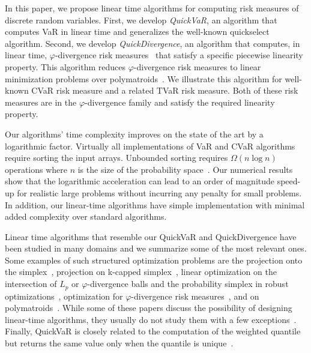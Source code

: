\documentclass[10pt]{article} %
\renewcommand{\cite}{\citep}
\begin{document}
In this paper, we propose linear time algorithms for computing risk measures of discrete random variables. First, we develop \emph{QuickVaR}, an algorithm that computes VaR in linear time and generalizes the well-known quickselect algorithm. Second, we develop \emph{QuickDivergence}, an algorithm that computes, in linear time, $\varphi$-divergence risk measures~\cite{Ahmadi-Javid2012} that satisfy a specific piecewise linearity property. This algorithm reduces $\varphi$-divergence risk measures to linear minimization problems over polymatroids~\cite{Follmer2016}. We illustrate this algorithm for well-known CVaR risk measure and a related TVaR risk measure. Both of these risk measures are in the $\varphi$-divergence family and satisfy the required linearity property.  

Our algorithms' time complexity improves on the state of the art by a logarithmic factor. Virtually all implementations of VaR and CVaR algorithms require sorting the input arrays. Unbounded sorting requires $\Omega(n \log n)$ operations where $n$ is the size of the probability space~\cite{Follmer2016}. Our numerical results show that the logarithmic acceleration can lead to an order of magnitude speed-up for realistic large problems without incurring any penalty for small problems. In addition, our linear-time algorithms have simple implementation with minimal added complexity over standard algorithms.


Linear time algorithms that resemble our QuickVaR and QuickDivergence have been studied in many domains and we summarize some of the most relevant ones. Some examples of such structured optimization problems are the projection onto the simplex~\cite{adam2019projectionscanonicalsimplexadditional, Wang2013Simplex}, projection on k-capped simplex~\cite{kcapped_ang,Lim2016}, linear optimization on the intersection of $L_p$ or $\varphi$-divergence balls and the probability simplex in robust optimizations~\cite{Ho2022}, optimization for $\varphi$-divergence risk measures~\cite{Ahmadi-Javid2012}, and on polymatroids~\cite{Korte2012}. While some of these papers discuss the possibility of designing linear-time algorithms, they usually do not study them with a few exceptions~\cite{Condat2016,Lim2016}. Finally, QuickVaR is closely related to the computation of the weighted quantile but returns the same value only when the quantile is unique~\cite{Korte2012,cormen2001introduction}.
\end{document}
